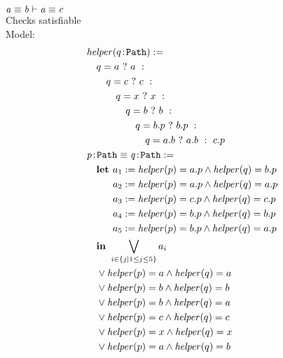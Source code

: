 \documentclass[a4paper]{article}
\begin{document}
$\mathit{a} \equiv \mathit{b} \vdash \mathit{a} \equiv \mathit{c}$\\
  Checks satisfiable\\
  Model:
  \begin{align*}
    &\helper(\sortedVar{q}{\Path}) :=\\&\quad
    \ite{q=a}{a}{\\&\qquad
      \ite{q=c}{c}{\\&\qquad\quad
        \ite{q=x}{x}{\\&\qquad\qquad
          \ite{q=b}{b}{\\&\qquad\qquad\quad
            \ite{q=b.p}{b.p}{\\&\qquad\qquad\qquad
              \ite{q=a.b}{a.b}{c.p}
            }
          }
        }
      }
    }\\
    &\pathEq{\sortedVar{p}{\Path}}{\sortedVar{q}{\Path}} :=\\&\quad
    \Let    a_1 := \helper(p)=a.p \land \helper(q)=b.p\\
    &\quad\phantom{{}\Let{}} a_2 := \helper(p)=a.p \land \helper(q)=a.p\\
    &\quad\phantom{{}\Let{}} a_3 := \helper(p)=c.p \land \helper(q)=c.p\\
    &\quad\phantom{{}\Let{}} a_4 := \helper(p)=b.p \land \helper(q)=b.p\\
    &\quad\phantom{{}\Let{}} a_5 := \helper(p)=b.p \land \helper(q)=a.p\\
    &\quad\In
    \bigvee_{i\in\{j | 1\leq j\leq5\}} a_i\\
    &\quad\lor \helper(p)=a \land \helper(q)=a\\
    &\quad\lor \helper(p)=b \land \helper(q)=b\\
    &\quad\lor \helper(p)=b \land \helper(q)=a\\
    &\quad\lor \helper(p)=c \land \helper(q)=c\\
    &\quad\lor \helper(p)=x \land \helper(q)=x\\
    &\quad\lor \helper(p)=a \land \helper(q)=b\\
  \end{align*}
\end{document}
